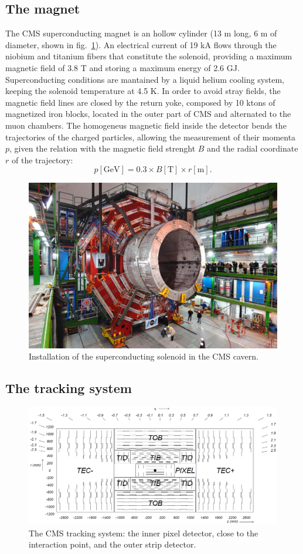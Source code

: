 \subsection{The magnet}
The CMS superconducting magnet is an hollow cylinder (13 m long, 6 m of diameter, shown in fig.~\ref{fig:CMS_solenoid}). An electrical current of 19 kA flows through the niobium and titanium fibers that constitute the solenoid, providing a maximum magnetic field of 3.8 T and storing a maximum energy of 2.6 GJ. Superconducting conditions are mantained by a liquid helium cooling system, keeping the solenoid temperature at 4.5 K. In order to avoid stray fields, the magnetic field lines are closed by the return yoke, composed by 10 ktons of magnetized iron blocks, located in the outer part of CMS and alternated to the muon chambers. The homogeneus magnetic field inside the detector bends the trajectories of the charged particles, allowing the measurement of their momenta $p$, given the relation with the magnetic field strenght $B$ and the radial coordinate $r$ of the trajectory:
\begin{equation}
p [\text{GeV}] = 0.3 \times B [\text{T}] \times r [\text{m}]. 
\end{equation}

\begin{figure}[!htb]
  \centering
    \includegraphics[width=.5\textwidth]{figures/CMS_solenoid.jpeg}
  \caption{Installation of the superconducting solenoid in the CMS cavern.}
  \label{fig:CMS_solenoid}
\end{figure}

\subsection{The tracking system}
\begin{figure}[!htb]
  \centering
    \includegraphics[width=.9\textwidth]{figures/cmstracker.png}
  \caption{The CMS tracking system: the inner pixel detector, close to the interaction point, and the outer strip detector.}
  \label{fig:CMS_tracker}
\end{figure}

